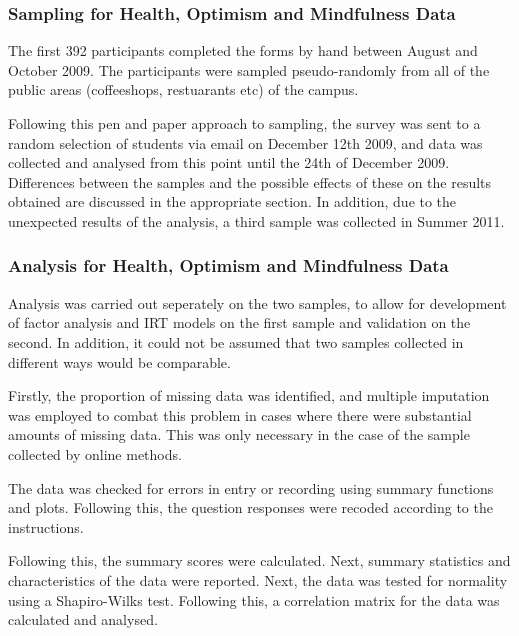 \subsubsection{Sampling for Health, Optimism and Mindfulness Data}

The first 392 participants completed the forms by hand between August and October 2009. The participants were sampled pseudo-randomly from all of the public areas (coffeeshops, restuarants etc) of the campus.

Following this pen and paper approach to sampling, the survey was sent to a random selection of students via email on December 12th 2009, and data was collected and analysed from this point until the 24th of December 2009. Differences between the samples and the possible effects of these on the results obtained are discussed in the appropriate section. In addition, due to the unexpected results of the analysis, a third sample was collected in Summer 2011. 

\subsubsection{Analysis for Health, Optimism and Mindfulness Data}
Analysis was carried out seperately on the two samples, to allow for development of factor analysis and IRT models on the first sample and validation on the second. In addition, it could not be assumed that two samples collected in different ways would be comparable. 

Firstly, the proportion of missing data was identified, and multiple imputation was employed to combat this problem in cases where there were substantial amounts of missing data. This was only necessary in the case of the sample collected by online methods. 


The data was checked for errors in entry or recording using summary functions and plots. Following this, the question responses were recoded according to the instructions.

Following this, the summary scores were calculated. Next, summary statistics and characteristics of the data were reported. Next, the data was tested for normality using a Shapiro-Wilks test. Following this, a correlation matrix for the data was calculated and analysed.


